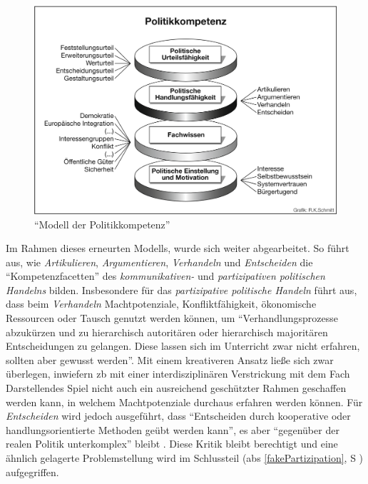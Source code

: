 \begin{figure}[htb]
    \centering
    \includegraphics[width=1\linewidth]{Detjen et al. 2012 p. 15.png}
    \caption{\enquote{Modell der Politikkompetenz} \autocite[15]{Detjen.2012}}
    \label{2012kompMod}
\end{figure}

Im Rahmen dieses erneurten Modells, wurde sich weiter abgearbeitet. So führt \textcite[27]{Massing2012} aus, wie \emph{Artikulieren}, \emph{Argumentieren}, \emph{Verhandeln} und \emph{Entscheiden} die \enquote{Kompetenzfacetten} des \emph{kommunikativen-} und \emph{partizipativen politischen Handelns} bilden. 
Insbesondere für das \emph{partizipative politische Handeln} führt \textcite[27]{Massing2012} aus, dass beim \emph{Verhandeln} Machtpotenziale, Konfliktfähigkeit, ökonomische Ressourcen oder Tausch genutzt werden können, um \enquote{Verhandlungsprozesse abzukürzen und zu hierarchisch autoritären oder hierarchisch majoritären Entscheidungen zu gelangen. Diese lassen sich im Unterricht zwar nicht erfahren, sollten aber gewusst werden}. 
Mit einem kreativeren Ansatz ließe sich zwar überlegen, inwiefern \gls{zb} mit einer interdisziplinären Verstrickung mit dem Fach Darstellendes Spiel nicht auch ein ausreichend geschützter Rahmen geschaffen werden kann, in welchem Machtpotenziale durchaus erfahren werden können. Für \emph{Entscheiden} wird jedoch ausgeführt, dass \enquote{Entscheiden durch kooperative oder handlungsorientierte Methoden geübt werden kann}, es aber \enquote{gegenüber der realen Politik unterkomplex} bleibt \autocite[27]{Massing2012}. Diese Kritik bleibt berechtigt und eine ähnlich gelagerte Problemstellung wird im Schlussteil (\gls{abs} \ref{fakePartizipation}, \gls{S} \pageref{fakePartizipation}) aufgegriffen. 



